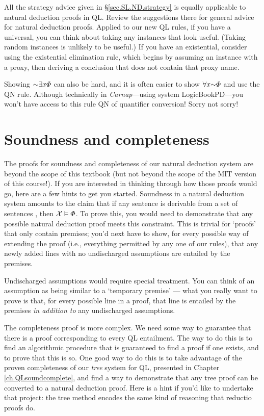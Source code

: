 All the strategy advice given in \S\ref{sec.SL.ND.strategy} is equally applicable to natural deduction proofs in QL. Review the suggestions there for general advice for natural deduction proofs. Applied to our new QL rules, if you have a universal, you can think about taking any instances that look useful. (Taking random instances is unlikely to be useful.) If you have an existential, consider using the existential elimination rule, which begins by assuming an instance with a proxy, then deriving a conclusion that does not contain that proxy name.

Showing $\enot \qt{\exists}{x}\metaA{}$ can also be hard, and it is often easier to show  $\qt{\forall}{x}\enot \metaA{}$ and use the QN rule. {\color{black} Although technically in \textit{Carnap}---using system LogicBookPD---you won't have access to this rule QN of quantifier conversion! Sorry not sorry!} 



\section{Soundness and completeness}

The proofs for soundness and completeness of our natural deduction system are beyond the scope of this textbook {\color{black} (but not beyond the scope of the MIT version of this course!)}. If you are interested in thinking through how those proofs would go, here are a few hints to get you started. Soundness in a natural deduction system amounts to the claim that if any sentence \metaA{} is derivable from a set of sentences \metaSetX{}, then $\mathcal{X}{}\vDash\varPhi{}$. To prove this, you would need to demonstrate that any possible natural deduction proof meets this constraint. This is trivial for `proofs' that only contain premises; you'd next have to show, for every possible way of extending the proof (i.e., everything permitted by any one of our rules), that any newly added lines with no undischarged assumptions are entailed by the premises.

Undischarged assumptions would require special treatment. You can think of an assumption as being similar to a `temporary premise' --- what you really want to prove is that, for every possible line in a proof, that line is entailed by the premises \emph{in addition to} any undischarged assumptions.

The completeness proof is more complex. We need some way to guarantee that there is a proof corresponding to every QL entailment. The way to do this is to find an algorithmic procedure that is guaranteed to find a proof if one exists, and to prove that this is so. One good way to do this is to take advantage of the proven completeness of our \emph{tree} system for QL, presented in Chapter \ref{ch.QLsoundcomplete}, and find a way to demonstrate that any tree proof can be converted to a natural deduction proof. Here is a hint if you'd like to undertake that project: the tree method encodes the same kind of reasoning that reductio proofs do.



